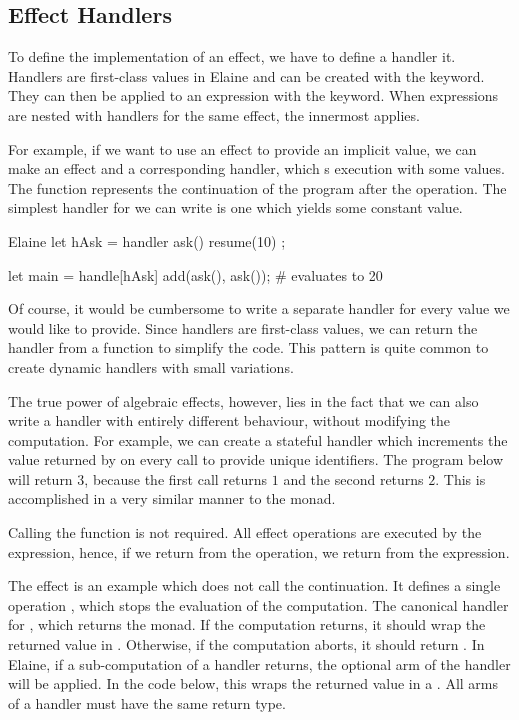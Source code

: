 \subsection{Effect Handlers}\label{sec:alghandlers}

To define the implementation of an effect, we have to define a handler it. Handlers are first-class values in Elaine and can be created with the  keyword. They can then be applied to an expression with the  keyword. When  expressions are nested with handlers for the same effect, the innermost  applies.

For example, if we want to use an effect to provide an implicit value, we can make an effect  and a corresponding handler, which s execution with some values. The  function represents the continuation of the program after the operation. The simplest handler for  we can write is one which yields some constant value.

\begin{lst}{Elaine}
let hAsk = handler { ask() { resume(10) } };

let main = handle[hAsk] add(ask(), ask()); # evaluates to 20
\end{lst}

Of course, it would be cumbersome to write a separate handler for every value we would like to provide. Since handlers are first-class values, we can return the handler from a function to simplify the code. This pattern is quite common to create dynamic handlers with small variations.


The true power of algebraic effects, however, lies in the fact that we can also write a handler with entirely different behaviour, without modifying the computation. For example, we can create a stateful handler which increments the value returned by  on every call to provide unique identifiers. The program below will return $3$, because the first  call returns $1$ and the second returns $2$. This is accomplished in a very similar manner to the  monad.


Calling the  function is not required. All effect operations are executed by the  expression, hence, if we return from the operation, we return from the  expression.

The  effect is an example which does not call the continuation. It defines a single operation , which stops the evaluation of the computation. The canonical handler for , which returns the  monad. If the computation returns, it should wrap the returned value in . Otherwise, if the computation aborts, it should return . In Elaine, if a sub-computation of a handler returns, the optional  arm of the handler will be applied. In the code below, this wraps the returned value in a . All arms of a handler must have the same return type.

